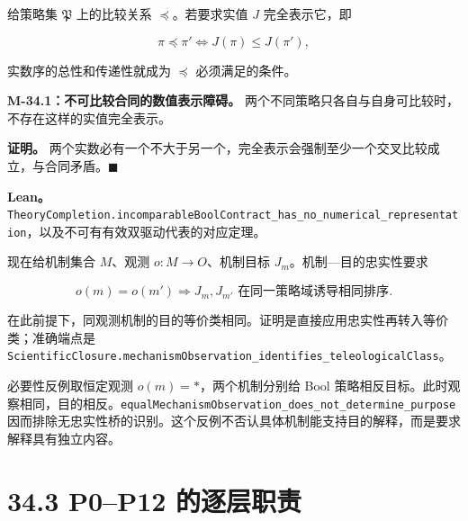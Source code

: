 \documentclass[
  11pt,
  oneside]{book}
\begin{document}
给策略集 \(\mathfrak P\) 上的比较关系 \(\preceq\)。若要求实值 \(J\) 完全表示它，即

\[\pi\preceq\pi'\iff J(\pi)\le J(\pi'),\]

实数序的总性和传递性就成为 \(\preceq\) 必须满足的条件。

\hypertarget{m-34-1}{}\label{m-34-1}

\textbf{M-34.1：不可比较合同的数值表示障碍。} 两个不同策略只各自与自身可比较时，不存在这样的实值完全表示。

\textbf{证明。} 两个实数必有一个不大于另一个，完全表示会强制至少一个交叉比较成立，与合同矛盾。\(\blacksquare\)

\textbf{Lean。} \nolinkurl{TheoryCompletion.incomparableBoolContract_has_no_numerical_representation}，以及不可有有效双驱动代表的对应定理。

现在给机制集合 \(M\)、观测 \(o:M\to O\)、机制目标 \(J_m\)。机制---目的忠实性要求

\[o(m)=o(m')\Longrightarrow J_m,J_{m'}\text{ 在同一策略域诱导相同排序}.\]

在此前提下，同观测机制的目的等价类相同。证明是直接应用忠实性再转入等价类；准确端点是 \nolinkurl{ScientificClosure.mechanismObservation_identifies_teleologicalClass}。

必要性反例取恒定观测 \(o(m)=*\)，两个机制分别给 Bool 策略相反目标。此时观察相同，目的相反。\nolinkurl{equalMechanismObservation_does_not_determine_purpose} 因而排除无忠实性桥的识别。这个反例不否认具体机制能支持目的解释，而是要求解释具有独立内容。

\section{34.3 P0--P12 的逐层职责}\label{p0p12-ux7684ux9010ux5c42ux804cux8d23}
\end{document}
